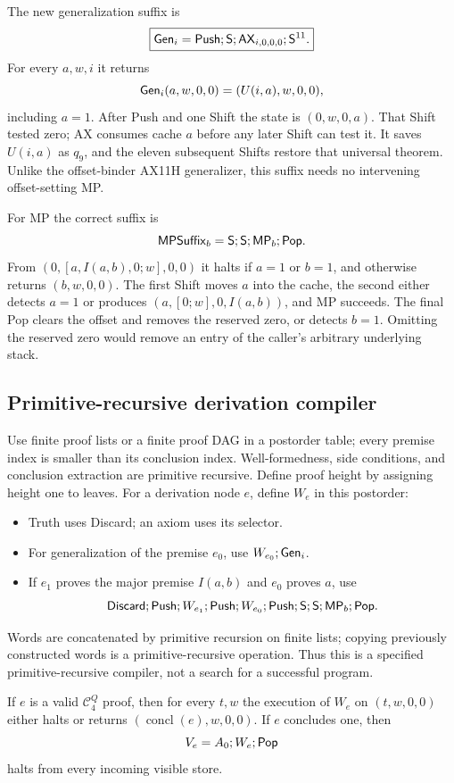 The new generalization suffix is
\[
 \boxed{\mathsf{Gen}_i=\mathsf{Push};\mathsf{S};\mathsf{AX}_{i,0,0,0};\mathsf{S}^{11}.}
\]
For every $a,w,i$ it returns
\[
 \mathsf{Gen}_i(a,w,0,0)=(U(i,a),w,0,0),
\]
including $a=1$. After Push and one Shift the state is $(0,w,0,a)$.
That Shift tested zero; AX consumes cache $a$ before any later Shift
can test it. It saves $U(i,a)$ as $q_9$, and the eleven subsequent
Shifts restore that universal theorem. Unlike the offset-binder
AX11H generalizer, this suffix needs no intervening offset-setting MP.

For MP the correct suffix is
\[
 \mathsf{MPSuffix}_b=\mathsf{S};\mathsf{S};\mathsf{MP}_b;\mathsf{Pop}.
\]
From $(0,[a,I(a,b),0;w],0,0)$ it halts if $a=1$ or $b=1$,
and otherwise returns $(b,w,0,0)$. The first Shift moves $a$ into
the cache, the second either detects $a=1$ or produces
$(a,[0;w],0,I(a,b))$, and MP succeeds. The final Pop clears the
offset and removes the reserved zero, or detects $b=1$.
Omitting the reserved zero would remove an entry of the caller's
arbitrary underlying stack.

\subsection{Primitive-recursive derivation compiler}

Use finite proof lists or a finite proof DAG in a postorder table; every
premise index is smaller than its conclusion index. Well-formedness,
side conditions, and conclusion extraction are primitive recursive.
Define proof height by assigning height one to leaves.
For a derivation node $e$, define $W_e$ in this postorder:
\begin{itemize}
\item Truth uses Discard; an axiom uses its selector.
\item For generalization of the premise $e_0$, use
$W_{e_0};\mathsf{Gen}_i$.
\item If $e_1$ proves the major premise $I(a,b)$ and $e_0$ proves $a$,
use
\[
 \mathsf{Discard};\mathsf{Push};W_{e_1};\mathsf{Push};W_{e_0};\mathsf{Push};
                        \mathsf{S};\mathsf{S};\mathsf{MP}_b;\mathsf{Pop}.
\]
\end{itemize}
Words are concatenated by primitive recursion on finite lists; copying
previously constructed words is a primitive-recursive operation.
Thus this is a specified primitive-recursive compiler, not a search
for a successful program.

\begin{theorem}
If $e$ is a valid $\mathcal C^Q_4$ proof, then for every $t,w$ the
execution of $W_e$ on $(t,w,0,0)$ either halts or returns
$(\operatorname{concl}(e),w,0,0)$. If $e$ concludes one, then
\[
 V_e=A_0;W_e;\mathsf{Pop}
\]
halts from every incoming visible store.
\end{theorem}

